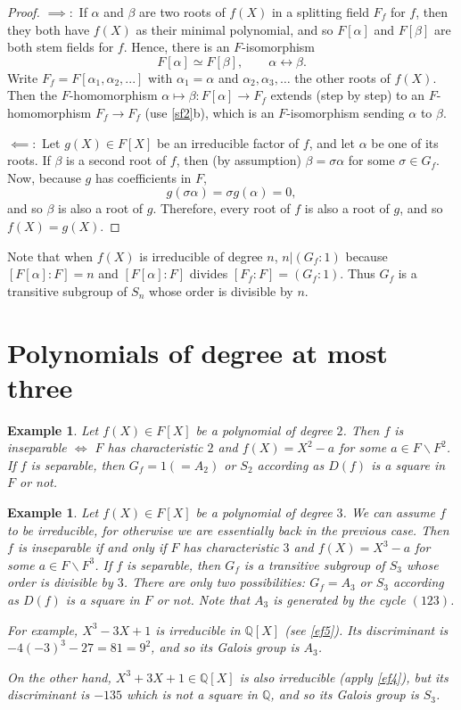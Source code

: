 \documentclass[a4paper,11pt,final,openany]{memoir}
\newtheorem{example}[X]{Example}
\theoremstyle{nonumberplain}
\newtheorem{proof}{Proof.}
\begin{document}
\begin{proof}
$\implies\colon$ If $\alpha$ and $\beta$ are two roots of $f(X)$ in a
splitting field $F_{f}$ for $f$, then they both have $f(X)$ as their minimal
polynomial, and so $F[\alpha]$ and $F[\beta]$ are both stem fields for $f$.
Hence, there is an $F$-isomorphism
\[
F[\alpha]\simeq F[\beta],\qquad\alpha\leftrightarrow\beta.
\]
Write $F_{f}=F[\alpha_{1},\alpha_{2},...]$ with $\alpha_{1}=\alpha$ and
$\alpha_{2},\alpha_{3},\ldots$ the other roots of $f(X)$. Then the
$F$-homomorphism $\alpha\mapsto\beta\colon F[\alpha]\rightarrow F_{f}$ extends
(step by step) to an $F$-homomorphism $F_{f}\rightarrow F_{f}$ (use
\ref{sf2}b), which is an $F$-isomorphism sending $\alpha$ to $\beta$.

$\impliedby\colon$ Let $g(X)\in F[X]$ be an irreducible factor of $f$, and let
$\alpha$ be one of its roots. If $\beta$ is a second root of $f$, then (by
assumption) $\beta=\sigma\alpha$ for some $\sigma\in G_{f}$. Now, because $g$
has coefficients in $F$,
\[
g(\sigma\alpha)=\sigma g(\alpha)=0,
\]
and so $\beta$ is also a root of $g$. Therefore, every root of $f$ is also a
root of $g$, and so $f(X)=g(X).$
\end{proof}

Note that when $f(X)$ is irreducible of degree $n$, $n|(G_{f}\colon1)$ because
$[F[\alpha]\colon F]=n$ and $[F[\alpha]\colon F]$ divides $[F_{f}\colon
F]=(G_{f}\colon1)$. Thus $G_{f}$ is a transitive subgroup of $S_{n}$ whose
order is divisible by $n$.

\section{Polynomials of degree at most three}

\begin{example}
\label{cg5}Let $f(X)\in F[X]$ be a polynomial of degree $2$. Then $f$ is
inseparable $\iff$ $F$ has characteristic $2$ and $f(X)=X^{2}-a$ for some
$a\in F\smallsetminus F^{2}$. If $f$ is separable, then $G_{f}=1(=A_{2})$ or
$S_{2}$ according as $D(f)$ is a square in $F$ or not.
\end{example}

\begin{example}
\label{cg6}Let $f(X)\in F[X]$ be a polynomial of degree $3$. We can assume $f$
to be irreducible, for otherwise we are essentially back in the previous case.
Then $f$ is inseparable if and only if $F$ has characteristic $3$ and
$f(X)=X^{3}-a$ for some $a\in F\smallsetminus F^{3}$. If $f$ is separable,
then $G_{f}$ is a transitive subgroup of $S_{3}$ whose order is divisible by
$3$. There are only two possibilities: $G_{f}=A_{3}$ or $S_{3}$ according as
$D(f)$ is a square in $F$ or not. Note that $A_{3}$ is generated by the cycle
$(123)$.

For example, $X^{3}-3X+1$ is irreducible in $\mathbb{Q}{}[X]$ (see \ref{ef5}).
Its discriminant is $-4(-3)^{3}-27=81=9^{2}$, and so its Galois group is
$A_{3}$.

On the other hand, $X^{3}+3X+1\in\mathbb{Q}[X]$ is also irreducible (apply
\ref{ef4}), but its discriminant is $-135$ which is not a square in
$\mathbb{Q}$, and so its Galois group is $S_{3}$.
\end{example}
\end{document}
